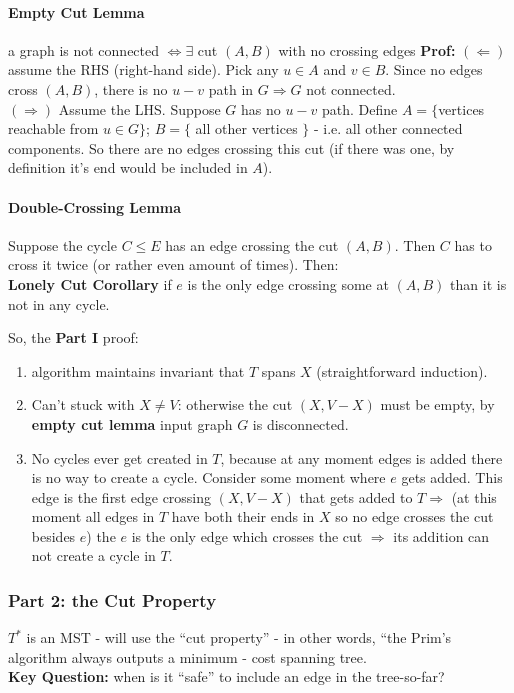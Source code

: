 \documentclass{scrartcl}
\begin{document}
\paragraph{Empty Cut Lemma} a graph is not connected $\Leftrightarrow \exists$
cut $(A, B)$ with no crossing edges {\bf Prof: } $(\Leftarrow)$ assume the RHS
(right-hand side). Pick any $u \in A$ and $v \in B$. Since no edges cross $(A,
B)$, there is no $u-v$ path in $G
\Rightarrow G$ not connected. \\
$(\Rightarrow)$ Assume the LHS. Suppose $G$ has no $u-v$ path. Define $A =
\{$vertices reachable from $u \in G\}$; $B = \{$ all other vertices $\}$ - i.e.
all other connected components. So there are no edges crossing this cut (if
there was one, by definition it's end would be included in $A$).

\paragraph{Double-Crossing Lemma} Suppose the cycle $C \leq E$ has an edge
crossing the cut $(A,B)$. Then $C$ has to cross it twice (or rather even amount
of times). Then: \\
{\bf Lonely Cut Corollary} if $e$ is the only edge crossing some at $(A, B)$
than it is not in any cycle.

So, the {\bf Part I} proof:\\
\begin{enumerate}
\item algorithm maintains invariant that $T$ spans $X$ (straightforward
  induction).
\item Can't stuck with $X \neq V$: otherwise the cut $(X, V - X)$ must be empty,
  by {\bf empty cut lemma} input graph $G$ is disconnected.
\item No cycles ever get created in $T$, because at any moment edges is added
  there is no way to create a cycle. Consider some moment where $e$ gets added.
  This edge is the first edge crossing $(X, V-X)$ that gets added to $T
  \Rightarrow$ (at this moment all edges in $T$ have both their ends in $X$ so
  no edge crosses the cut besides $e$) the $e$ is the only edge which crosses
  the cut $\Rightarrow$ its addition can not create a cycle in $T$.
\end{enumerate}
\subsubsection*{Part 2: the Cut Property } $T^*$ is an MST - will use the ``cut
property'' - in other words, ``the Prim's algorithm always outputs a minimum -
cost spanning tree.\\
{\bf Key Question: } when is it ``safe'' to include an edge in the tree-so-far?
\end{document}
